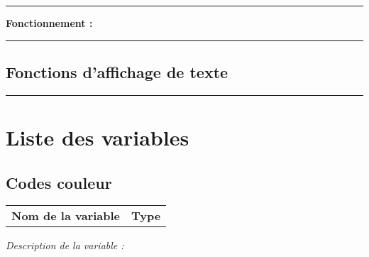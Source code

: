 \documentclass[a4paper,10pt]{article}
\begin{document}

\par\noindent\rule{\textwidth}{0.4pt}

\begin{justify}
    \textbf{Fonctionnement :}

    
\end{justify}







\color{sec2}\par\noindent\rule{\textwidth}{0.4pt}\color{text}

\color{sec2}
\subsection{Fonctions d'affichage de texte}\color{text}





\color{sec1}\par\noindent\rule{\textwidth}{0.4pt}\color{text}

\color{sec1}
\section{Liste des variables}\color{text}

\color{sec2}
\subsection{Codes couleur}\color{text}

\begin{justify}
    \begin{tabular}{l|l}
        \textbf{Nom de la variable} & \textbf{Type}
    \end{tabular}
\end{justify}

\begin{justify}
    \textit{Description de la variable :}
\end{justify}

\end{document}
